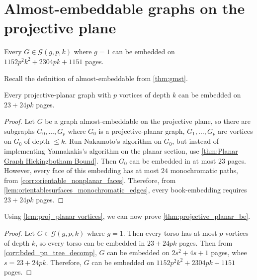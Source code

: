 
\section{Almost-embeddable graphs on the projective plane}

\begin{theorem}\label{thm:projective_planar_be}
	Every $G \in \mathcal{G}(g, p, k)$ where $g = 1$ can be embedded on $1152p^2 k^2 + 2304 pk + 1151$ pages.
\end{theorem}
Recall the definition of almost-embeddable from \cref{thm:gmst}. 
\begin{lemma}\label{lem:proj_planar vortices}
	Every projective-planar graph with $p$ vortices of depth $k$ can be embedded on $23 + 24pk$ pages.
\end{lemma}
\begin{proof}
	Let $G$ be a graph almost-embeddable on the projective plane, so there are subgraphs $G_0, \ldots, G_p$ where $G_0$ is a projective-planar graph, $G_1, \ldots, G_p$ are vortices on $G_0$ of depth $\leq k$. 
	Run Nakamoto's algorithm on $G_0$, but instead of implementing Yannakakis's algorithm on the planar section, use \cref{thm:Planar Graph Hickingbotham Bound}. Then $G_0$ can be embedded in at most $23$ pages. However, every face of this embedding has at most $24$ monochromatic paths, from \cref{corr:orientable_nonplanar_faces}. Therefore, from \cref{lem:orientablesurfaces_monochromatic_edges}, every book-embedding requires $23 + 24pk$ pages.
\end{proof}

Using \cref{lem:proj_planar vortices}, we can now prove \cref{thm:projective_planar_be}.
\begin{proof}
	Let $G \in \mathcal{G}(g, p, k)$ where $g = 1$. Then every torso has at most $p$ vortices of depth $k$, so every torso can be embedded in $23 + 24 pk$ pages. Then from \cref{corr:bded_pn_tree_decomp}, $G$ can be embedded on $2s^2 + 4s + 1$ pages, whee $s = 23 + 24pk$. Therefore, $G$ can be embedded on $1152p^2 k^2 + 2304 pk + 1151$ pages.
\end{proof}